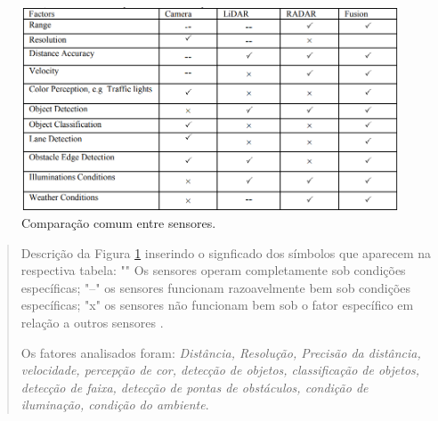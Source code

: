 \begin{figure}[H]
\centering
\includegraphics[width=12cm]{Figures/juncao-table.png}
\caption{Comparação comum entre sensores.}
\label{tabela-juncao}
\end{figure}
\begin{quote}
Descrição da Figura \ref{tabela-juncao} inserindo o signficado dos símbolos que aparecem na respectiva tabela: 
"\checkmark" Os sensores operam completamente sob condições específicas; 
"--" os sensores funcionam razoavelmente bem sob condições específicas; "x" os sensores não funcionam bem sob o fator específico em relação a outros sensores \cite{sensors}.

Os fatores analisados foram: \textit{Distância, Resolução, Precisão da distância, velocidade, percepção de cor, detecção de objetos, classificação de objetos, detecção de faixa, detecção de pontas de obstáculos, condição de iluminação, condição do ambiente}.  
\end{quote}

